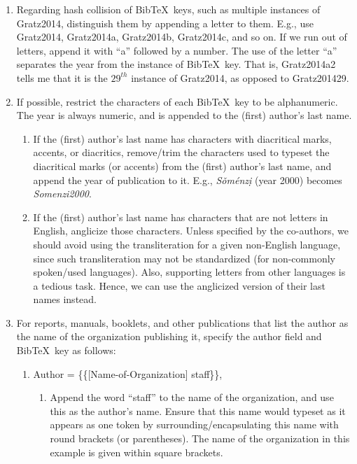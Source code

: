 \documentclass[letter,12pt]{article}
\begin{document}
\begin{enumerate}
\begin{enumerate}
\begin{enumerate}
		\item {\bf Rationale: Duplicate {\sc Bib}\TeX\ entries will cause problems in typesetting.}
		\end{enumerate}
	\item Regarding hash collision of {\sc Bib}\TeX\ keys, such as multiple instances of Gratz2014, distinguish them by appending a letter to them. E.g., use Gratz2014, Gratz2014a, Gratz2014b, Gratz2014c, and so on. If we run out of letters, append it with ``a'' followed by a number. The use of the letter ``a'' separates the year from the instance of {\sc Bib}\TeX\ key. That is, Gratz2014a2 tells me that it is the $29^{th}$ instance of Gratz2014, as opposed to Gratz201429.
	\item If possible, restrict the characters of each {\sc Bib}\TeX\ key to be alphanumeric. The year is always numeric, and is appended to the (first) author's last name. \vspace{-0.2cm}
		\begin{enumerate} \itemsep -2pt
		\item If the (first) author's last name has characters with diacritical marks, accents, or diacritics, remove/trim the characters used to typeset the diacritical marks (or accents) from the (first) author's last name, and append the year of publication to it. E.g., {\it S{\v{o}}m{\'{e}}nz{\d{i}}} (year 2000) becomes {\it Somenzi2000}.
		\item If the (first) author's last name has characters that are not letters in English, anglicize those characters. Unless specified by the co-authors, we should avoid using the transliteration for a given non-English language, since such transliteration may not be standardized (for non-commonly spoken/used languages). Also, supporting letters from other languages is a tedious task. Hence, we can use the anglicized version of their last names instead.
		\end{enumerate}
	\item For reports, manuals, booklets, and other publications that list the author as the name of the organization publishing it, specify the author field and {\sc Bib}\TeX\ key as follows: \vspace{-0.2cm}
		\begin{enumerate} \itemsep -2pt
		\item Author = \{\{[Name-of-Organization] staff\}\}, \vspace{-0.1cm}
			\begin{enumerate} \itemsep -1pt
			\item Append the word ``staff'' to the name of the organization, and use this as the author's name. Ensure that this name would typeset as it appears as one token by surrounding/encapsulating this name with round brackets (or parentheses). The name of the organization in this example is given within square brackets.

\end{enumerate}
\end{enumerate}
\end{enumerate}
\end{enumerate}
\end{document}
